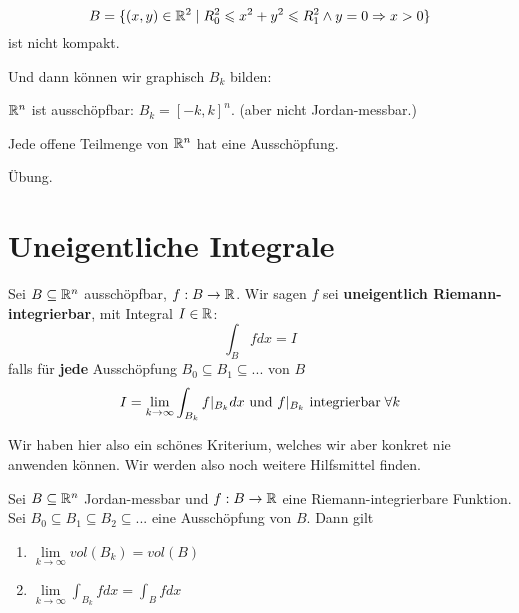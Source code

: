 \documentclass[main.tex]{subfiles}
\begin{document}
\begin{Beispiel}
  $$B = \{(x,y) \in \mathbb{R}^2 \mid R_0^2 \leqslant x^2 +y^2 \leqslant R_1^2 \land y = 0 \Rightarrow x > 0\}$$
  ist nicht kompakt.

  Und dann können wir graphisch $B_k$ bilden:

\end{Beispiel}

\begin{Beispiel}
  $\mathbb{R}^n$ ist ausschöpfbar: $B_k = [-k,k]^n$. (aber nicht Jordan-messbar.)
\end{Beispiel}

\begin{Theorem}
  Jede offene Teilmenge von $\mathbb{R}^n$ hat eine Ausschöpfung.
\end{Theorem}

\begin{Beweis}
  Übung.
\end{Beweis}


\section{Uneigentliche Integrale}

\begin{Definition}
  Sei $B \subseteq \mathbb{R}^n$ ausschöpfbar, $f: B \to \mathbb{R}$. Wir sagen $f$ sei \textbf{uneigentlich Riemann-integrierbar}, mit Integral $I \in \mathbb{R}$:
  $$\int_B f dx = I$$
  falls für \textbf{jede} Ausschöpfung $B_0 \subseteq B_1 \subseteq ...$ von $B$
  $$I = \lim \limits_{k \to \infty} \int_{B_k} f|_{B_k} dx \text{ und } f|_{B_k} \text{ integrierbar} \;\forall k$$
\end{Definition}

\begin{Bemerkung}
  Wir haben hier also ein schönes Kriterium, welches wir aber konkret nie anwenden können. Wir werden also noch weitere Hilfsmittel finden.
\end{Bemerkung}

\begin{Theorem}
  Sei $B \subseteq \mathbb{R}^n$ Jordan-messbar und $f: B \to \mathbb{R}$ eine Riemann-integrierbare Funktion. Sei $B_0 \subseteq B_1 \subseteq B_2 \subseteq ...$ eine Ausschöpfung von $B$. Dann gilt
  \begin{enumerate}
    \item $\lim \limits_{k \to \infty} vol(B_k) = vol(B)$
    \item $\lim \limits_{k \to \infty} \int_{B_k} f dx = \int_B f dx$
  \end{enumerate}
\end{Theorem}
\end{document}
